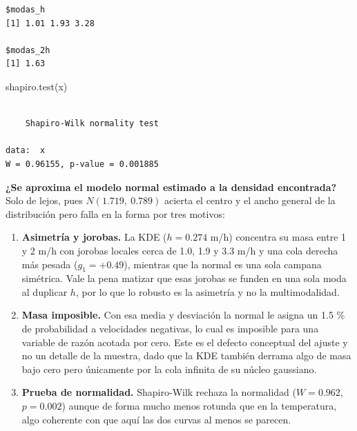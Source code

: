 \documentclass[oneside, openany, fontset=libertinus]{mitthesis}
\newenvironment{Shaded}{\begin{snugshade}}{\end{snugshade}}
\newcommand{\AttributeTok}[1]{\textcolor[rgb]{0.40,0.45,0.13}{#1}}
\newcommand{\DecValTok}[1]{\textcolor[rgb]{0.68,0.00,0.00}{#1}}
\newcommand{\FunctionTok}[1]{\textcolor[rgb]{0.28,0.35,0.67}{#1}}
\newcommand{\NormalTok}[1]{\textcolor[rgb]{0.00,0.23,0.31}{#1}}
\newcommand{\OtherTok}[1]{\textcolor[rgb]{0.00,0.23,0.31}{#1}}
\newcommand{\SpecialCharTok}[1]{\textcolor[rgb]{0.37,0.37,0.37}{#1}}
\providecommand{\tightlist}{\setlength{\itemsep}{0pt}\setlength{\parskip}{0pt}}
\begin{document}
\begin{Shaded}
\end{Shaded}

\begin{verbatim}
$modas_h
[1] 1.01 1.93 3.28

$modas_2h
[1] 1.63
\end{verbatim}

\begin{Shaded}
\begin{Highlighting}[]
\FunctionTok{shapiro.test}\NormalTok{(x)}
\end{Highlighting}
\end{Shaded}

\begin{verbatim}

    Shapiro-Wilk normality test

data:  x
W = 0.96155, p-value = 0.001885
\end{verbatim}

\textbf{¿Se aproxima el modelo normal estimado a la densidad
encontrada?} Solo de lejos, pues \(N(1.719,\ 0.789)\) acierta el centro
y el ancho general de la distribución pero falla en la forma por tres
motivos:

\begin{enumerate}
\def\labelenumi{\alph{enumi}.}
\tightlist
\item
  \textbf{Asimetría y jorobas.} La KDE (\(h = 0.274\) m/h) concentra su
  masa entre 1 y 2 m/h con jorobas locales cerca de 1.0, 1.9 y 3.3 m/h y
  una cola derecha más pesada (\(g_1 = +0.49\)), mientras que la normal
  es una sola campana simétrica. Vale la pena matizar que esas jorobas
  se funden en una sola moda al duplicar \(h\), por lo que lo robusto es
  la asimetría y no la multimodalidad.
\item
  \textbf{Masa imposible.} Con esa media y desviación la normal le
  asigna un 1.5 \% de probabilidad a velocidades negativas, lo cual es
  imposible para una variable de razón acotada por cero. Este es el
  defecto conceptual del ajuste y no un detalle de la muestra, dado que
  la KDE también derrama algo de masa bajo cero pero únicamente por la
  cola infinita de su núcleo gaussiano.
\item
  \textbf{Prueba de normalidad.} Shapiro-Wilk rechaza la normalidad
  (\(W = 0.962\), \(p = 0.002\)) aunque de forma mucho menos rotunda que
  en la temperatura, algo coherente con que aquí las dos curvas al menos
  se parecen.
\end{enumerate}
\end{document}
